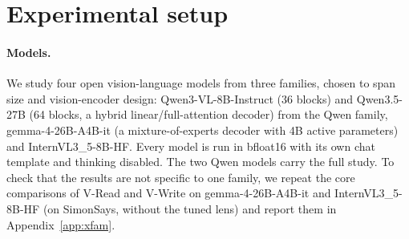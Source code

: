 
\section{Experimental setup}
\label{sec:exp-setup}

\paragraph{Models.} We study four open vision-language models from three families, chosen to span size and vision-encoder design: Qwen3-VL-8B-Instruct (36 blocks) and Qwen3.5-27B (64 blocks, a hybrid linear/full-attention decoder) from the Qwen family, gemma-4-26B-A4B-it (a mixture-of-experts decoder with 4B active parameters) and InternVL3\_5-8B-HF. Every model is run in bfloat16 with its own chat template and thinking disabled. The two Qwen models carry the full study. To check that the results are not specific to one family, we repeat the core comparisons of V-Read and V-Write on gemma-4-26B-A4B-it and InternVL3\_5-8B-HF (on SimonSays, without the tuned lens) and report them in Appendix~\ref{app:xfam}.

